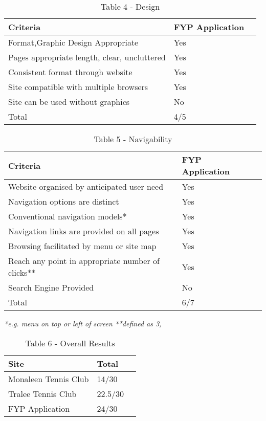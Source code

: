\begin{table}[H]
\caption{Table 4 - Design}
\begin{center}
    \begin{tabular}{ | l | l | p{5cm} |}
    \hline
\textbf{Criteria} & \textbf{FYP Application}\\ \hline
	Format,Graphic Design Appropriate & Yes \\ \hline
	Pages appropriate length, clear, uncluttered& Yes \\ \hline
	Consistent format through website & Yes \\ \hline
	Site compatible with multiple browsers & Yes\\ \hline
	Site can be used without graphics & No\\ \hline
	Total & 4/5 \\ \hline	
    \end{tabular}
\end{center}
\label{fig:projecttable4}
\end{table}

\begin{table}[H]
\caption{Table 5 - Navigability}
\begin{center}
    \begin{tabular}{ | l | l | p{5cm} |}
    \hline
\textbf{Criteria} & \textbf{FYP Application}\\ \hline
	Website organised by anticipated user need & Yes\\ \hline
	Navigation options are distinct& Yes \\ \hline
	Conventional navigation models*& Yes\\ \hline
	Navigation links are provided on all pages & Yes\\ \hline
	Browsing facilitated by menu or site map &Yes \\ \hline
	Reach any point in appropriate number of clicks** & Yes\\ \hline
	Search Engine Provided & No\\ \hline
	Total & 6/7 \\ \hline	
    \end{tabular}
\end{center}
\label{fig:projecttable5}
\end{table}
\textit{*e.g. menu on top or left of screen}\newline
\textit{**defined as 3,} \cite{smith2001applying}

\begin{table}[H]
\caption{Table 6 - Overall Results}
\begin{center}
    \begin{tabular}{ | l | l | p{5cm} |}
    \hline
	Site & Total\\ \hline
	Monaleen Tennis Club & 14/30\\ \hline
	Tralee Tennis Club & 22.5/30\\ \hline
	FYP Application & 24/30\\ \hline	
    \end{tabular}
\end{center}
\label{fig:projecttable6}
\end{table}

